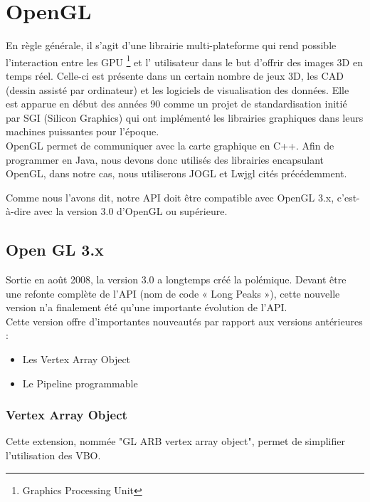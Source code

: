 \documentclass[11pt]{report}
\begin{document}
\section{OpenGL}

  En règle générale, il s'agit d'une librairie multi-plateforme qui rend possible l'interaction entre les GPU \footnote{Graphics Processing Unit} et l' utilisateur dans le but d'offrir des images 3D en temps réel. Celle-ci est présente dans un certain nombre de jeux  3D, les CAD (dessin assisté par ordinateur) et les logiciels de visualisation des données. Elle est apparue en début des années 90 comme un projet de standardisation initié par SGI (Silicon Graphics) qui ont implémenté les librairies graphiques dans leurs machines puissantes pour l'époque. 
\\

 OpenGL permet de communiquer avec la carte graphique en C++. Afin de programmer en Java, nous devons donc utilisés des librairies encapsulant OpenGL, dans notre cas, nous utiliserons JOGL et Lwjgl cités précédemment.


Comme nous l'avons dit, notre API doit être compatible avec OpenGL 3.x, c'est-à-dire avec la version 3.0 d'OpenGL ou supérieure.
\subsection{Open GL 3.x}
Sortie en août 2008, la version 3.0 a longtemps créé la polémique. Devant être une refonte complète de l'API (nom de code « Long Peaks »), cette nouvelle version n'a finalement été qu'une importante évolution de l'API.\cite{opengl3} %
\\

Cette version offre d'importantes nouveautés par rapport aux versions antérieures :
\begin{itemize}
\item Les Vertex Array Object
\item Le Pipeline programmable
\end{itemize}

\subsubsection{Vertex Array Object}
Cette extension, nommée "GL ARB vertex array object", permet de simplifier l'utilisation des VBO.
\\
\end{document}
